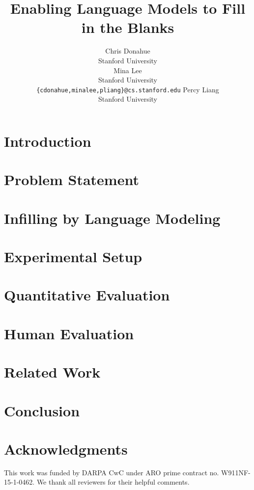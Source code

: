 \documentclass[11pt,a4paper]{article}
\title{Enabling Language Models to Fill in the Blanks}
\author{
Chris Donahue \\ Stanford University \\
\And Mina Lee \\ Stanford University \\ \texttt{\{cdonahue,minalee,pliang\}@cs.stanford.edu} 
\And Percy Liang \\ Stanford University \\
}
\date{}
\begin{document}
\maketitle

\begin{abstract}

\end{abstract}

\section{Introduction}\label{sec:intro}


\section{Problem Statement}\label{sec:problem}


\section{Infilling by Language Modeling}\label{sec:approach}


\section{Experimental Setup}\label{sec:experiments}


\section{Quantitative Evaluation}\label{sec:statistical}


\section{Human Evaluation}\label{sec:human}


\section{Related Work}\label{sec:related}


\section{Conclusion}\label{sec:conclusion}


\section*{Acknowledgments}

This work was funded by DARPA CwC under ARO prime contract no. W911NF-15-1-0462.
We thank all reviewers for their helpful comments.




\clearpage

\appendix


\end{document}
